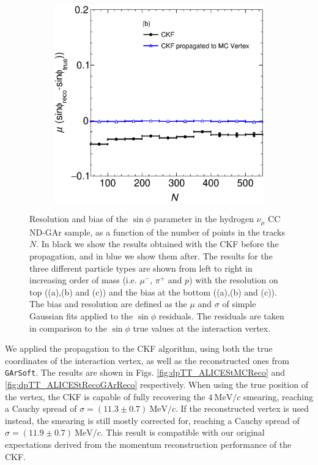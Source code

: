 \begin{figure}[t]
\begin{subfigure}{0.32\textwidth}
         \caption{} \label{fig:BiassinphiVSNPoints_VertexComparison_211}
     \end{subfigure}
          \begin{subfigure}{0.32\textwidth}
         \centering
        \includegraphics[width=\textwidth]{figures/ch6-TKI/sinphiRes/BiassinphiVSNPoints_VertexComparison_2212.eps}
         \caption{} \label{fig:BiassinphiVSNPoints_VertexComparison_2212}
     \end{subfigure}
        \caption{Resolution and bias of the $\sin\phi$ parameter in the hydrogen $\nu_\mu$ CC ND-GAr sample, as a function of the number of points in the tracks $N$. In black we show the results obtained with the CKF before the propagation, and in blue we show them after. The results for the three different particle types are shown from left to right in increasing order of mass (i.e. $\mu^-$, $\pi^+$ and $p$) with the resolution on top ((a),(b) and (c)) and the bias at the bottom ((a),(b) and (c)).  The bias and resolution are defined as the $\mu$ and $\sigma$ of simple Gaussian fits applied to the $\sin\phi$ residuals. The residuals are taken in comparison to the $\sin\phi$ true values at the interaction vertex.}
        \label{fig:sinphiRes2DNPoints_Vertex}
\end{figure}


We applied the propagation to the CKF algorithm, using both the true coordinates of the interaction vertex, as well as the reconstructed ones from \texttt{GArSoft}. The results are shown in Figs. \ref{fig:dpTT_ALICEStMCReco} and \ref{fig:dpTT_ALICEStRecoGArReco} respectively. When using the true position of the vertex, the CKF is capable of fully recovering the $4 \ \text{MeV}/c$ smearing, reaching a Cauchy spread of $\sigma= (11.3\pm0.7) \ \text{MeV}/c$. If the reconstructed vertex is used instead, the smearing is still mostly corrected for, reaching a Cauchy spread of $\sigma= (11.9\pm0.7) \ \text{MeV}/c$. This result is compatible with our original expectations derived from the momentum reconstruction performance of the CKF.

